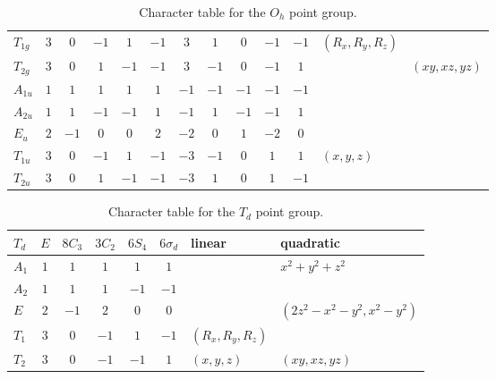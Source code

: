 \documentclass[../notes.tex]{subfiles}
\begin{document}
\begin{itemize}
\begin{table}[h!]
\begin{tabular}{l|cccccccccc|l|l}
            $T_{1g}$ & $3$ & $0$  & $-1$ & $1$  & $-1$ & $3$  & $1$  & $0$  & $-1$ & $-1$ & $(R_x,R_y,R_z)$ & \\
            $T_{2g}$ & $3$ & $0$  & $1$  & $-1$ & $-1$ & $3$  & $-1$ & $0$  & $-1$ & $1$  & & $(xy,xz,yz)$\\
            $A_{1u}$ & $1$ & $1$  & $1$  & $1$  & $1$  & $-1$ & $-1$ & $-1$ & $-1$ & $-1$ & & \\
            $A_{2u}$ & $1$ & $1$  & $-1$ & $-1$ & $1$  & $-1$ & $1$  & $-1$ & $-1$ & $1$  & & \\
            $E_u$    & $2$ & $-1$ & $0$  & $0$  & $2$  & $-2$ & $0$  & $1$  & $-2$ & $0$  & & \\
            $T_{1u}$ & $3$ & $0$  & $-1$ & $1$  & $-1$ & $-3$ & $-1$ & $0$  & $1$  & $1$  & $(x,y,z)$ & \\
            $T_{2u}$ & $3$ & $0$  & $1$  & $-1$ & $-1$ & $-3$ & $1$  & $0$  & $1$  & $-1$ & & \\
        \end{tabular}
        \caption{Character table for the $O_h$ point group.}
        \label{tab:characterTable-Oh}
    \end{table}
    \begin{table}[h!]
        \centering
        \small
        \renewcommand{\arraystretch}{1.2}
        \begin{tabular}{l|ccccc|l|l}
            $T_d$ & $E$ & $8C_3$ & $3C_2$ & $6S_4$ & $6\sigma_d$ & linear & quadratic\\
            \hline
            $A_1$ & $1$ & $1$  & $1$  & $1$  & $1$  & & $x^2+y^2+z^2$\\
            $A_2$ & $1$ & $1$  & $1$  & $-1$ & $-1$ & & \\
            $E$   & $2$ & $-1$ & $2$  & $0$  & $0$  & & $(2z^2-x^2-y^2,x^2-y^2)$\\
            $T_1$ & $3$ & $0$  & $-1$ & $1$  & $-1$ & $(R_x,R_y,R_z)$ & \\
            $T_2$ & $3$ & $0$  & $-1$ & $-1$ & $1$  & $(x,y,z)$ & $(xy,xz,yz)$\\
        \end{tabular}
        \caption{Character table for the $T_d$ point group.}
        \label{tab:characterTable-Td}
    \end{table}
\end{itemize}
\end{document}
